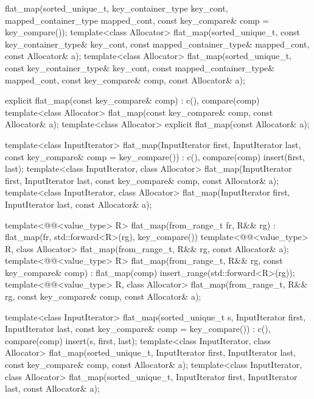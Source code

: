 \begin{codeblock}
{{    flat_map(sorted_unique_t, key_container_type key_cont, mapped_container_type mapped_cont,
             const key_compare& comp = key_compare());
    template<class Allocator>
      flat_map(sorted_unique_t, const key_container_type& key_cont,
               const mapped_container_type& mapped_cont, const Allocator& a);
    template<class Allocator>
      flat_map(sorted_unique_t, const key_container_type& key_cont,
               const mapped_container_type& mapped_cont,
               const key_compare& comp, const Allocator& a);

    explicit flat_map(const key_compare& comp)
      : c(), compare(comp) { }
    template<class Allocator>
      flat_map(const key_compare& comp, const Allocator& a);
    template<class Allocator>
      explicit flat_map(const Allocator& a);

    template<class InputIterator>
      flat_map(InputIterator first, InputIterator last, const key_compare& comp = key_compare())
        : c(), compare(comp) { insert(first, last); }
    template<class InputIterator, class Allocator>
      flat_map(InputIterator first, InputIterator last,
               const key_compare& comp, const Allocator& a);
    template<class InputIterator, class Allocator>
      flat_map(InputIterator first, InputIterator last, const Allocator& a);

    template<@@<value_type> R>
      flat_map(from_range_t fr, R&& rg)
        : flat_map(fr, std::forward<R>(rg), key_compare()) { }
    template<@@<value_type> R, class Allocator>
      flat_map(from_range_t, R&& rg, const Allocator& a);
    template<@@<value_type> R>
      flat_map(from_range_t, R&& rg, const key_compare& comp)
        : flat_map(comp) { insert_range(std::forward<R>(rg)); }
    template<@@<value_type> R, class Allocator>
      flat_map(from_range_t, R&& rg, const key_compare& comp, const Allocator& a);

    template<class InputIterator>
      flat_map(sorted_unique_t s, InputIterator first, InputIterator last,
               const key_compare& comp = key_compare())
        : c(), compare(comp) { insert(s, first, last); }
    template<class InputIterator, class Allocator>
      flat_map(sorted_unique_t, InputIterator first, InputIterator last,
               const key_compare& comp, const Allocator& a);
    template<class InputIterator, class Allocator>
      flat_map(sorted_unique_t, InputIterator first, InputIterator last, const Allocator& a);

}}
\end{codeblock}
